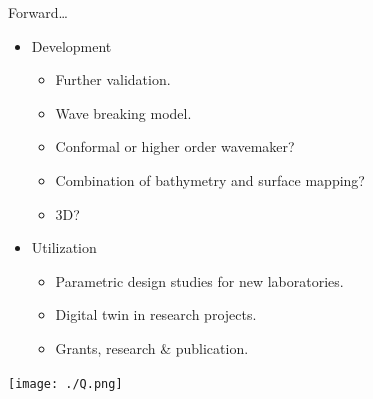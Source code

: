 \documentclass{sintefbeamer}
\renewcommand{\_}[1]{_\mr{#1}}
\begin{document}
\begin{frame}{Forward\ldots}
	\begin{itemize}
		\item Development
		\begin{itemize}
			\item Further validation.
			\item Wave breaking model.
			\item Conformal or higher order wavemaker? 
			\item Combination of bathymetry and surface mapping?
			\item 3D?
		\end{itemize}
	\item Utilization
		\begin{itemize}
			\item Parametric design studies for new laboratories.
			\item Digital twin in research projects.
			\item Grants, research \& publication.
		\end{itemize} 
	\end{itemize}

\end{frame}

\begin{frame}{}
	\texttt{[image: ./Q.png]}
\end{frame}

\backmatter
\end{document}

